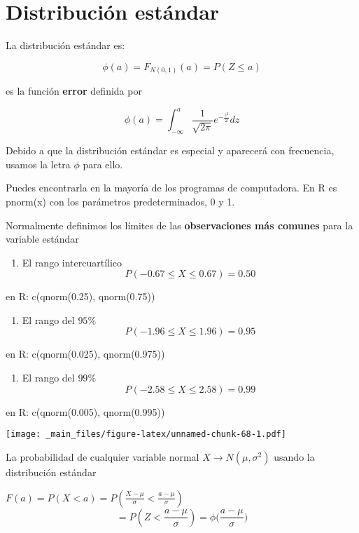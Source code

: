 \documentclass[
]{book}
\providecommand{\tightlist}{%
  \setlength{\itemsep}{0pt}\setlength{\parskip}{0pt}}
\begin{document}
\hypertarget{distribuciuxf3n-estuxe1ndar}{%
\section{Distribución estándar}\label{distribuciuxf3n-estuxe1ndar}}

La distribución estándar es:

\[\phi(a)=F_{N(0,1)}(a)=P(Z \leq a)\]

es la función \textbf{error} definida por

\[\phi(a)=\int_{-\infty}^{a} \frac{1}{\sqrt{2\pi}}e^{-\frac{z^2}{2}} dz\]

Debido a que la distribución estándar es especial y aparecerá con frecuencia, usamos la letra \(\phi\) para ello.

Puedes encontrarla en la mayoría de los programas de computadora. En R es pnorm(x) con los parámetros predeterminados, 0 y 1.

Normalmente definimos los límites de las \textbf{observaciones más comunes} para la variable estándar

\begin{enumerate}
\def\labelenumi{\arabic{enumi})}
\tightlist
\item
  El rango intercuartílico \[P(-0.67 \leq X \leq 0.67)=0.50\]
\end{enumerate}

en R: c(qnorm(0.25), qnorm(0.75))

\begin{enumerate}
\def\labelenumi{\arabic{enumi})}
\setcounter{enumi}{1}
\tightlist
\item
  El rango del \(95\%\) \[P(-1.96 \leq X \leq 1.96)=0.95\]
\end{enumerate}

en R: c(qnorm(0.025), qnorm(0.975))

\begin{enumerate}
\def\labelenumi{\arabic{enumi})}
\setcounter{enumi}{2}
\tightlist
\item
  El rango del \(99\%\) \[P(-2.58 \leq X \leq 2.58)=0.99\]
\end{enumerate}

en R: c(qnorm(0.005), qnorm(0.995))

\texttt{[image: \_main\_files/figure-latex/unnamed-chunk-68-1.pdf]}

La probabilidad de cualquier variable normal \(X\rightarrow N(\mu, \sigma^2)\) usando la distribución estándar

\(F(a)=P(X<a)=P(\frac{X-\mu}{\sigma}<\frac{a-\mu}{\sigma})\)
\[=P(Z < \frac{a-\mu}{\sigma})= \phi \big(\frac{a-\mu}{\sigma}\big)\]
\end{document}
